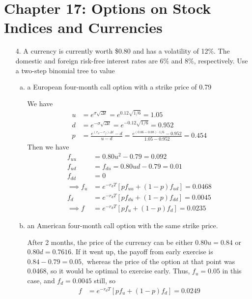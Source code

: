 \documentclass{article}
\begin{document}
\newpage
\section*{Chapter 17: Options on Stock Indices and Currencies}

\begin{itemize}
	\item[4.] A currency is currently worth \$0.80 and has a volatility of 12\%. The domestic and foreign risk-free interest rates are 6\% and 8\%, respectively. Use a two-step binomial tree to value
		\begin{enumerate}[(a)]
			\item a European four-month call option with a strike price of 0.79
				\begin{soln}
					We have
					\begin{align*}
						u &= e^{\sigma\sqrt{\Delta t}} = e^{0.12\sqrt{1/6}} = 1.05 \\
						d &= e^{-\sigma\sqrt{\Delta t}}  = e^{-0.12\sqrt{1/6}} = 0.952 \\
						p &= \frac{e^{(r_d-r_f)\Delta t}-d}{u-d} = \frac{e^{(0.06-0.08)\cdot 1/6} - 0.952}{1.05-0.952} = 0.454
					\end{align*}
					Then we have
					\begin{align*}
						f_{uu} &= 0.80u^2-0.79 = 0.092 \\
						f_{ud} &= f_{du} = 0.80ud-0.79=0.01 \\
						f_{dd} &= 0 \\
						\implies f_u &= e^{-r_dT} \left[ pf_{uu} + (1-p)f_{ud} \right] = 0.0468 \\
						f_d &= e^{-r_dT}\left[ pf_{du}+(1-p)f_{dd} \right] = 0.0045 \\
						\implies f &= e^{-r_d T}\left[ pf_u + (1-p)f_d \right] = 0.0235
					\end{align*}
				\end{soln}

			\item an American four-month call option with the same strike price.
				\begin{soln}
					After 2 months, the price of the currency can be either $0.80u=0.84$ or $0.80d =0.7616.$ If it went up, the payoff from early exercise is $0.84-0.79=0.05,$ whereas the price of the option at that point was 0.0468, so it would be optimal to exercise early. Thus, $f_u=0.05$ in this case, and $f_d=0.0045$ still, so 
					\begin{align*}
						f &= e^{-r_d T}\left[ pf_u + (1-p)f_d \right] = 0.0249
					\end{align*}
				\end{soln}
				

\end{enumerate}
\end{itemize}
\end{document}
